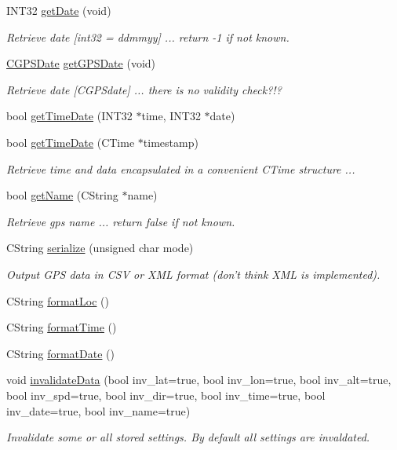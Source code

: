 \begin{DoxyCompactItemize}
INT32 \hyperlink{classCGPSData_a9583ab5dc6d62fe9b834f9f60a941c46}{getDate} (void)
\begin{DoxyCompactList}\small\item\em Retrieve date \mbox{[}int32 = ddmmyy\mbox{]} ... return -\/1 if not known. \item\end{DoxyCompactList}\item 
\hyperlink{classCGPSDate}{CGPSDate} \hyperlink{classCGPSData_a584126066851ff423552623dbac18aa4}{getGPSDate} (void)
\begin{DoxyCompactList}\small\item\em Retrieve date \mbox{[}CGPSdate\mbox{]} ... there is no validity check?!? \item\end{DoxyCompactList}\item 
bool \hyperlink{classCGPSData_a88077fca813b5bf9da6db8e3c28119d4}{getTimeDate} (INT32 $\ast$time, INT32 $\ast$date)
\item 
bool \hyperlink{classCGPSData_a0b2a7356ee6838b3e499c09f01afe128}{getTimeDate} (CTime $\ast$timestamp)
\begin{DoxyCompactList}\small\item\em Retrieve time and data encapsulated in a convenient CTime structure ... \item\end{DoxyCompactList}\item 
bool \hyperlink{classCGPSData_adbbe1bbc3921aeedcfb8cb25d8839562}{getName} (CString $\ast$name)
\begin{DoxyCompactList}\small\item\em Retrieve gps name ... return false if not known. \item\end{DoxyCompactList}\item 
CString \hyperlink{classCGPSData_a979ff9cfa092eb3aec37c54bd2470bb7}{serialize} (unsigned char mode)
\begin{DoxyCompactList}\small\item\em Output GPS data in CSV or XML format (don't think XML is implemented). \item\end{DoxyCompactList}\item 
CString \hyperlink{classCGPSData_acc4a072edd7468a6b63c9413b706d1c9}{formatLoc} ()
\item 
CString \hyperlink{classCGPSData_af3bfb72e6274e4c0f5cf7a8663cac1a4}{formatTime} ()
\item 
CString \hyperlink{classCGPSData_ada2f10d46084a5351f6beb2e8f7b8a0d}{formatDate} ()
\item 
void \hyperlink{classCGPSData_a36fa1f44defa2ebfce6345a8bc500f1a}{invalidateData} (bool inv\_\-lat=true, bool inv\_\-lon=true, bool inv\_\-alt=true, bool inv\_\-spd=true, bool inv\_\-dir=true, bool inv\_\-time=true, bool inv\_\-date=true, bool inv\_\-name=true)
\begin{DoxyCompactList}\small\item\em Invalidate some or all stored settings. By default all settings are invaldated. \item\end{DoxyCompactList}\end{DoxyCompactItemize}

